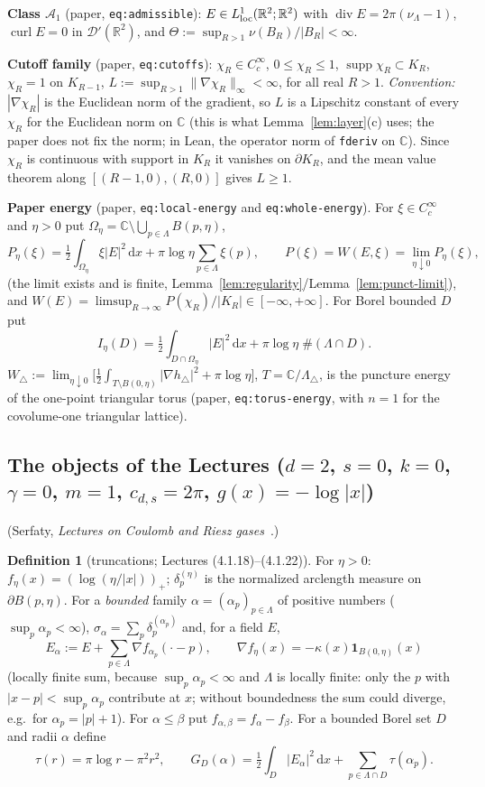 \documentclass[11pt]{article}
\theoremstyle{definition}
\newtheorem{definition}[theorem]{Definition}
\theoremstyle{remark}
\newcommand{\R}{\mathbb R}
\newcommand{\C}{\mathbb C}
\newcommand{\dd}{\,\mathrm d}
\newcommand{\Lam}{\Lambda}
\DeclareMathOperator{\supp}{supp}
\DeclareMathOperator{\Div}{div}
\begin{document}
\textbf{Class $\mathcal A_1$} (paper, \texttt{eq:admissible}): $E\in L^1_{\rm loc}(\R^2;\R^2)$ with
$\Div E=2\pi(\nu_\Lam-1)$, $\operatorname{curl}E=0$ in $\mathcal D'(\R^2)$, and
$\Theta:=\sup_{R>1}\nu(B_R)/|B_R|<\infty$.

\textbf{Cutoff family} (paper, \texttt{eq:cutoffs}): $\chi_R\in C^\infty_c$, $0\le\chi_R\le1$, $\supp\chi_R\subset K_R$,
$\chi_R=1$ on $K_{R-1}$, $L:=\sup_{R>1}\|\nabla\chi_R\|_\infty<\infty$, for all real $R>1$.  \emph{Convention:} $|\nabla\chi_R|$ is the Euclidean norm of the gradient, so $L$ is a Lipschitz constant of every $\chi_R$ for the Euclidean norm on $\C$ (this is what Lemma~\ref{lem:layer}(c) uses; the paper does not fix the norm; in Lean, the operator norm of \texttt{fderiv} on $\C$).  Since $\chi_R$ is
continuous with support in $K_R$ it vanishes on $\partial K_R$, and the mean value theorem along $[(R-1,0),(R,0)]$
gives $L\ge1$.

\textbf{Paper energy} (paper, \texttt{eq:local-energy} and \texttt{eq:whole-energy}).  For $\xi\in C_c^\infty$ and $\eta>0$ put $\Omega_\eta=\C\setminus\bigcup_{p\in\Lam}B(p,\eta)$,
\[
P_\eta(\xi)=\tfrac12\int_{\Omega_\eta}\xi|E|^2\dd x+\pi\log\eta\sum_{p\in\Lam}\xi(p),\qquad
P(\xi)=W(E,\xi)=\lim_{\eta\downarrow0}P_\eta(\xi),
\]
(the limit exists and is finite, Lemma~\ref{lem:regularity}/Lemma~\ref{lem:punct-limit}), and
$W(E)=\limsup_{R\to\infty}P(\chi_R)/|K_R|\in[-\infty,+\infty]$.  For Borel bounded $D$ put
\[
I_\eta(D)=\tfrac12\int_{D\cap\Omega_\eta}|E|^2\dd x+\pi\log\eta\;\#(\Lam\cap D).
\]
$W_\triangle:=\lim_{\eta\downarrow 0}\bigl[\tfrac12\int_{T\setminus B(0,\eta)}|\nabla h_\triangle|^2+\pi\log\eta\bigr]$,
$T=\C/\Lam_\triangle$, is the puncture energy of the one-point triangular torus (paper, \texttt{eq:torus-energy},
with $n=1$ for the covolume-one triangular lattice).

\subsection{The objects of the Lectures ($d=2$, $s=0$, $k=0$, $\gamma=0$, $m=1$, $c_{d,s}=2\pi$, $g(x)=-\log|x|$)}
(Serfaty, \emph{Lectures on Coulomb and Riesz gases}~\cite{Lectures}.)

\begin{definition}[truncations; Lectures (4.1.18)--(4.1.22)]\label{def:trunc}
For $\eta>0$: $f_\eta(x)=(\log(\eta/|x|))_+$; $\delta^{(\eta)}_p$ is the normalized arclength measure on $\partial B(p,\eta)$.
For a \emph{bounded} family $\alpha=(\alpha_p)_{p\in\Lam}$ of positive numbers ($\sup_p\alpha_p<\infty$), $\sigma_\alpha=\sum_p\delta_p^{(\alpha_p)}$ and, for a field $E$,
\[
E_\alpha:=E+\sum_{p\in\Lam}\nabla f_{\alpha_p}(\cdot-p),\qquad \nabla f_\eta(x)=-\kappa(x)\mathbf 1_{B(0,\eta)}(x)
\]
(locally finite sum, because $\sup_p\alpha_p<\infty$ and $\Lam$ is locally finite: only the $p$ with $|x-p|<\sup_p\alpha_p$ contribute at $x$; without boundedness the sum could diverge, e.g.\ for $\alpha_p=|p|+1$).  For $\alpha\le\beta$ put $f_{\alpha,\beta}=f_\alpha-f_\beta$.  For a bounded Borel set $D$ and
radii $\alpha$ define
\[
\tau(r)=\pi\log r-\pi^2r^2,\qquad
G_D(\alpha)=\tfrac12\int_D|E_\alpha|^2\dd x+\sum_{p\in\Lam\cap D}\tau(\alpha_p).
\]
\end{definition}
\end{document}
